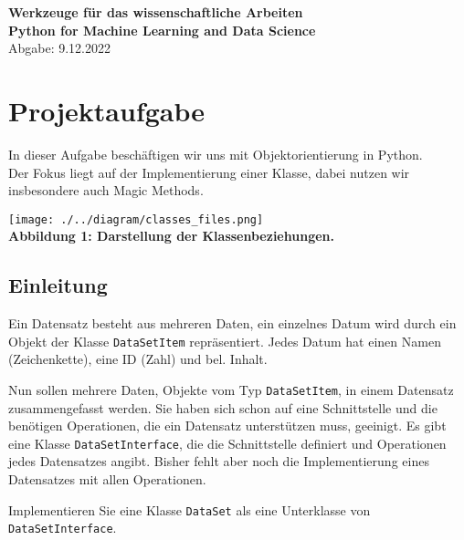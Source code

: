 \documentclass[]{article}
\begin{document}
\begin{center}
\thispagestyle{empty}
\textsf{
\Large\textbf{Werkzeuge für das wissenschaftliche Arbeiten}\\
\small\textbf{Python for Machine Learning and Data Science}\\
\bigskip\normalsize Abgabe: 9.12.2022}
\end{center}

\clearpage

\doublespacing
\renewcommand{\contentsname}{Inhaltsverzeichnis}
\tableofcontents

\clearpage

\onehalfspacing
\section{Projektaufgabe}

In dieser Aufgabe beschäftigen wir uns mit Objektorientierung in Python.\\
Der Fokus liegt auf der Implementierung einer Klasse, dabei nutzen wir insbesondere auch Magic Methods.\\
\medskip

\hspace*{2cm}\texttt{[image: ./../diagram/classes\_files.png]}\\
\hspace*{3cm}\scriptsize\bf Abbildung 1: \normalfont Darstellung der Klassenbeziehungen.\normalsize

\bigskip
\subsection{Einleitung}

Ein Datensatz besteht aus mehreren Daten, ein einzelnes Datum wird durch ein Objekt der Klasse \verb|DataSetItem| repräsentiert.
Jedes Datum hat einen Namen (Zeichenkette), eine ID (Zahl) und bel. Inhalt.
\setlength{\parindent}{0pt}\medskip

Nun sollen mehrere Daten, Objekte vom Typ \verb|DataSetItem|, in einem Datensatz zusammengefasst werden.
Sie haben sich schon auf eine Schnittstelle und die benötigen Operationen, die ein Datensatz unterstützen muss, geeinigt.
Es gibt eine Klasse \verb|DataSetInterface|, die die Schnittstelle definiert und Operationen jedes Datensatzes angibt.
Bisher fehlt aber noch die Implementierung eines Datensatzes mit allen Operationen.
\setlength{\parindent}{0pt}\medskip

Implementieren Sie eine Klasse \verb|DataSet| als eine Unterklasse von \verb|DataSetInterface|.
\end{document}
